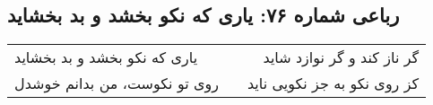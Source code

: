 \begin{center}
\section*{رباعی شماره ۷۶: یاری که نکو بخشد و بد بخشاید}
\label{sec:076}
\begin{longtable}{l p{0.5cm} r}
یاری که نکو بخشد و بد بخشاید
&&
گر ناز کند و گر نوازد شاید
\\
روی تو نکوست، من بدانم خوشدل
&&
کز روی نکو به جز نکویی ناید
\\
\end{longtable}
\end{center}
